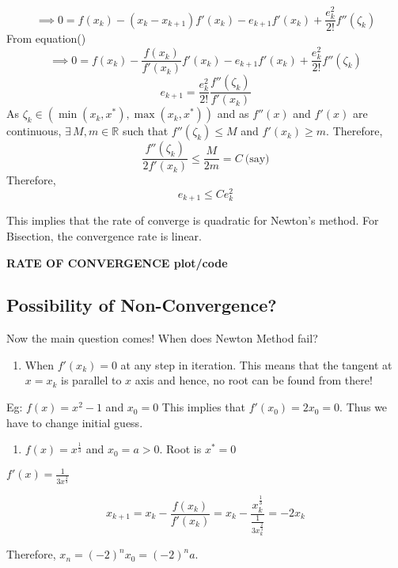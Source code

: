 \documentclass[
]{book}
\providecommand{\tightlist}{%
  \setlength{\itemsep}{0pt}\setlength{\parskip}{0pt}}
\begin{document}
\[\implies 0 = f(x_k) - (x_k-x_{k+1}) f'(x_k) - e_{k+1} f'(x_k) +\frac{e_k^2}{2!} f''(\zeta_k)\]
From equation()
\[\implies 0 =f(x_k) - \frac{f(x_k)}{f'(x_k)}f'(x_k) - e_{k+1} f'(x_k) +\frac{e_k^2}{2!} f''(\zeta_k)\]
\[ e_{k+1} = \frac{e_k^2}{2!} \frac{f''(\zeta_k)}{f'(x_k)}\]
As \(\zeta_k \in (\min(x_k,x^*),\max(x_k,x^*))\) and as \(f''(x)\) and \(f'(x)\) are continuous, \(\exists\, M,m\in \mathbb{R}\) such that \(f''(\zeta_k) \le M\) and \(f'(x_k) \ge m\). Therefore,
\[\frac{f''(\zeta_k)}{2 f'(x_k)} \le \frac{M}{2m} = C \ \text{(say)}\]
Therefore,
\begin{equation}
e_{k+1} \le C e_k^2
\end{equation}

This implies that the rate of converge is quadratic for Newton's method. For Bisection, the convergence rate is linear.

\textbf{RATE OF CONVERGENCE plot/code}

\hypertarget{possibility-of-non-convergence}{%
\subsection{Possibility of Non-Convergence?}\label{possibility-of-non-convergence}}

Now the main question comes! When does Newton Method fail?

\begin{enumerate}
\def\labelenumi{\arabic{enumi}.}
\tightlist
\item
  When \(f'(x_k) = 0\) at any step in iteration. This means that the tangent at \(x=x_k\) is parallel to \(x\) axis and hence, no root can be found from there!
\end{enumerate}

Eg: \(f(x) = x^2-1\) and \(x_0 = 0\) This implies that \(f'(x_0) = 2x_0 = 0\). Thus we have to change initial guess.

\begin{enumerate}
\def\labelenumi{\arabic{enumi}.}
\setcounter{enumi}{1}
\tightlist
\item
  \(f(x) = x^{\frac{1}{3}}\) and \(x_0 = a>0\). Root is \(x^*=0\)
\end{enumerate}

\(f'(x) = \frac{1}{3x^{\frac{2}{3}}}\)

\[x_{k+1}= x_k - \frac{f(x_k)}{f'(x_k)} = x_k - \frac{x_k^{\frac{1}{3}}}{\frac{1}{3x_k^{\frac{2}{3}}}} = -2 x_k\]

Therefore, \(x_n = (-2)^n x_0 = (-2)^n a\).
\end{document}
